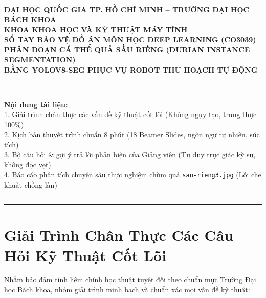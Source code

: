 \documentclass[11pt,a4paper]{article}
\begin{document}

\begin{center}
    {\large \textbf{ĐẠI HỌC QUỐC GIA TP. HỒ CHÍ MINH -- TRƯỜNG ĐẠI HỌC BÁCH KHOA}}\\[4pt]
    {\large \textbf{KHOA KHOA HỌC VÀ KỸ THUẬT MÁY TÍNH}}\\[12pt]
    {\Large \textbf{SỔ TAY BẢO VỆ ĐỒ ÁN MÔN HỌC DEEP LEARNING (CO3039)}}\\[6pt]
    {\LARGE \textbf{PHÂN ĐOẠN CÁ THỂ QUẢ SẦU RIÊNG (DURIAN INSTANCE SEGMENTATION)}}\\[4pt]
    {\large \textbf{BẰNG YOLOV8-SEG PHỤC VỤ ROBOT THU HOẠCH TỰ ĐỘNG}}\\[14pt]
    \rule{\linewidth}{1.2pt}\\[8pt]
    \textbf{Nội dung tài liệu:}\\
    1. Giải trình chân thực các vấn đề kỹ thuật cốt lõi (Không ngụy tạo, trung thực 100\%)\\
    2. Kịch bản thuyết trình chuẩn 8 phút (18 Beamer Slides, ngôn ngữ tự nhiên, súc tích)\\
    3. Bộ câu hỏi \& gợi ý trả lời phản biện của Giảng viên (Tư duy trực giác kỹ sư, không đọc vẹt)\\
    4. Báo cáo phân tích chuyên sâu thực nghiệm chùm quả \texttt{sau-rieng3.jpg} (Lỗi che khuất chồng lấn)\\
    \rule{\linewidth}{1.2pt}
\end{center}

\vspace{6pt}

\tableofcontents

\vspace{10pt}
\hrule
\vspace{10pt}

\section{Giải Trình Chân Thực Các Câu Hỏi Kỹ Thuật Cốt Lõi}
\label{sec:core_truth}

Nhằm bảo đảm tính liêm chính học thuật tuyệt đối theo chuẩn mực Trường Đại học Bách khoa, nhóm giải trình minh bạch và chuẩn xác mọi vấn đề kỹ thuật:
\end{document}
